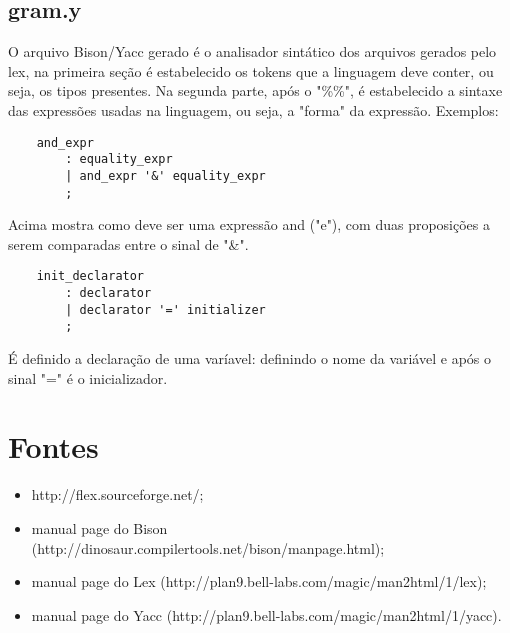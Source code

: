 \documentclass{article}
\begin{document}
\subsection*{gram.y}
    O arquivo Bison/Yacc gerado é o analisador sintático dos arquivos gerados
    pelo lex, na primeira seção é estabelecido os tokens que a linguagem deve
    conter, ou seja, os tipos presentes. Na segunda parte, após o "\%\%", é
    estabelecido a sintaxe das expressões usadas na linguagem, ou seja, a
    "forma" da expressão. Exemplos:
\begin{verbatim}
    and_expr
        : equality_expr
        | and_expr '&' equality_expr
        ;
\end{verbatim}
    Acima mostra como deve ser uma expressão and ("e"), com duas proposições a
    serem comparadas entre o sinal de "\&".
\begin{verbatim}
    init_declarator
        : declarator
        | declarator '=' initializer
        ;
\end{verbatim}
    É definido a declaração de uma varíavel: definindo o nome da variável e
    após o sinal "=" é o inicializador.
    
\section*{Fontes}
\begin{itemize}
    \item http://flex.sourceforge.net/;
    \item manual page do Bison (http://dinosaur.compilertools.net/bison/manpage.html);
    \item manual page do Lex (http://plan9.bell-labs.com/magic/man2html/1/lex);
    \item manual page do Yacc (http://plan9.bell-labs.com/magic/man2html/1/yacc).
\end{itemize}
\end{document}
